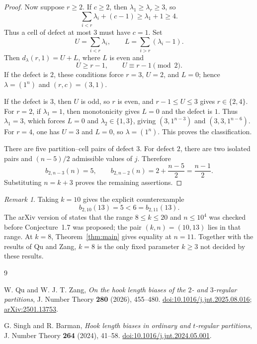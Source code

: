 \documentclass[11pt]{amsart}
\theoremstyle{remark}
\newtheorem{remark}[theorem]{Remark}
\begin{document}
\begin{proof}
Now suppose $r\ge2$.  If $c\ge2$, then $\lambda_1\ge\lambda_r\ge3$, so
\[
 \sum_{i<r}\lambda_i+(c-1)\ge\lambda_1+1\ge4.
\]
Thus a cell of defect at most $3$ must have $c=1$.  Set
\[
 U=\sum_{i<r}\lambda_i,
 \qquad
 L=\sum_{i>r}(\lambda_i-1).
\]
Then $d_\lambda(r,1)=U+L$, where $L$ is even and
\[
 U\ge r-1,
 \qquad
 U\equiv r-1\pmod 2.
\]
If the defect is $2$, these conditions force $r=3$, $U=2$, and $L=0$;
hence $\lambda=(1^n)$ and $(r,c)=(3,1)$.

If the defect is $3$, then $U$ is odd, so $r$ is even, and
$r-1\le U\le3$ gives $r\in\{2,4\}$.  For $r=2$, if
$\lambda_1=1$, then monotonicity gives $L=0$ and the defect is $1$.
Thus $\lambda_1=3$, which forces $L=0$ and
$\lambda_2\in\{1,3\}$, giving
$(3,1^{n-3})$ and $(3,3,1^{n-6})$.  For $r=4$, one has $U=3$ and
$L=0$, so $\lambda=(1^n)$.  This proves the classification.

There are five partition--cell pairs of defect $3$.  For defect $2$,
there are two isolated pairs and $(n-5)/2$ admissible values of $j$.
Therefore
\[
 b_{2,n-3}(n)=5,
 \qquad
 b_{2,n-2}(n)=2+\frac{n-5}{2}=\frac{n-1}{2}.
\]
Substituting $n=k+3$ proves the remaining assertions.
\end{proof}

\begin{remark}
Taking $k=10$ gives the explicit counterexample
\[
 b_{2,10}(13)=5<6=b_{2,11}(13).
\]
The arXiv version of \cite{QuZang} states that the range
$8\le k\le20$ and $n\le10^4$ was checked before Conjecture~1.7 was
proposed; the pair $(k,n)=(10,13)$ lies in that range.  At $k=8$,
Theorem~\ref{thm:main} gives equality at $n=11$.  Together with the
results of Qu and Zang, $k=8$ is the only fixed parameter $k\ge3$ not
decided by these results.
\end{remark}

\begin{thebibliography}{9}

W. Qu and W. J. T. Zang,
\emph{On the hook length biases of the $2$- and $3$-regular partitions},
J. Number Theory \textbf{280} (2026), 455--480.
\href{https://doi.org/10.1016/j.jnt.2025.08.016}
{doi:10.1016/j.jnt.2025.08.016};
\href{https://arxiv.org/abs/2501.13753}{arXiv:2501.13753}.

G. Singh and R. Barman,
\emph{Hook length biases in ordinary and $t$-regular partitions},
J. Number Theory \textbf{264} (2024), 41--58.
\href{https://doi.org/10.1016/j.jnt.2024.05.001}
{doi:10.1016/j.jnt.2024.05.001}.

\end{thebibliography}
\end{document}
